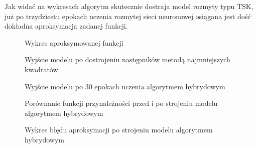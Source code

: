 \documentclass[a4paper,12pt,titlepage]{article}
\newenvironment{mypicture}[3][h]{\begin{figure}[#1]\centering\resizebox{#2}{!}{\texttt{[image: \#3]}}}{\end{figure}}
\begin{document}
Jak widać na wykresach algorytm skutecznie dostraja model rozmyty typu TSK, już po trzydziestu epokach uczenia rozmytej sieci neuronowej osiągana jest dość dokładna aproksymacja zadanej funkcji.

\begin{mypicture}[h]{\textwidth}{fig/fun.eps}
\caption{Wykres aproksymowanej funkcji}
\label{fun}
\end{mypicture}
\begin{mypicture}[p]{\textwidth}{fig/lsq.eps}
\caption{Wyjście modelu po dostrojeniu następników metodą najmniejszych kwadratów}
\label{lsq}
\end{mypicture}
\begin{mypicture}[p]{\textwidth}{fig/approx.eps}
\caption{Wyjście modelu po 30 epokach uczenia algorytmem hybrydowym}
\label{approx}
\end{mypicture}
\begin{mypicture}[p]{\textwidth}{fig/mem.eps}
\caption{Porównanie funkcji przynależności przed i po strojeniu modelu algorytmem hybrydowym}
\label{mem}
\end{mypicture}
\begin{mypicture}[p]{\textwidth}{fig/error.eps}
\caption{Wykres błędu aproksymacji po strojeniu modelu algorytmem hybrydowym}
\label{error}
\end{mypicture}
\end{document}
